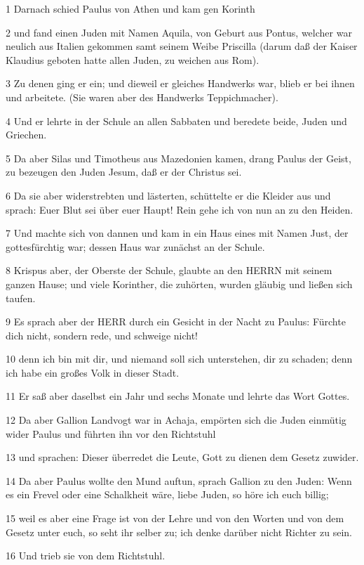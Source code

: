\par 1 Darnach schied Paulus von Athen und kam gen Korinth
\par 2 und fand einen Juden mit Namen Aquila, von Geburt aus Pontus, welcher war neulich aus Italien gekommen samt seinem Weibe Priscilla (darum daß der Kaiser Klaudius geboten hatte allen Juden, zu weichen aus Rom).
\par 3 Zu denen ging er ein; und dieweil er gleiches Handwerks war, blieb er bei ihnen und arbeitete. (Sie waren aber des Handwerks Teppichmacher).
\par 4 Und er lehrte in der Schule an allen Sabbaten und beredete beide, Juden und Griechen.
\par 5 Da aber Silas und Timotheus aus Mazedonien kamen, drang Paulus der Geist, zu bezeugen den Juden Jesum, daß er der Christus sei.
\par 6 Da sie aber widerstrebten und lästerten, schüttelte er die Kleider aus und sprach: Euer Blut sei über euer Haupt! Rein gehe ich von nun an zu den Heiden.
\par 7 Und machte sich von dannen und kam in ein Haus eines mit Namen Just, der gottesfürchtig war; dessen Haus war zunächst an der Schule.
\par 8 Krispus aber, der Oberste der Schule, glaubte an den HERRN mit seinem ganzen Hause; und viele Korinther, die zuhörten, wurden gläubig und ließen sich taufen.
\par 9 Es sprach aber der HERR durch ein Gesicht in der Nacht zu Paulus: Fürchte dich nicht, sondern rede, und schweige nicht!
\par 10 denn ich bin mit dir, und niemand soll sich unterstehen, dir zu schaden; denn ich habe ein großes Volk in dieser Stadt.
\par 11 Er saß aber daselbst ein Jahr und sechs Monate und lehrte das Wort Gottes.
\par 12 Da aber Gallion Landvogt war in Achaja, empörten sich die Juden einmütig wider Paulus und führten ihn vor den Richtstuhl
\par 13 und sprachen: Dieser überredet die Leute, Gott zu dienen dem Gesetz zuwider.
\par 14 Da aber Paulus wollte den Mund auftun, sprach Gallion zu den Juden: Wenn es ein Frevel oder eine Schalkheit wäre, liebe Juden, so höre ich euch billig;
\par 15 weil es aber eine Frage ist von der Lehre und von den Worten und von dem Gesetz unter euch, so seht ihr selber zu; ich denke darüber nicht Richter zu sein.
\par 16 Und trieb sie von dem Richtstuhl.
